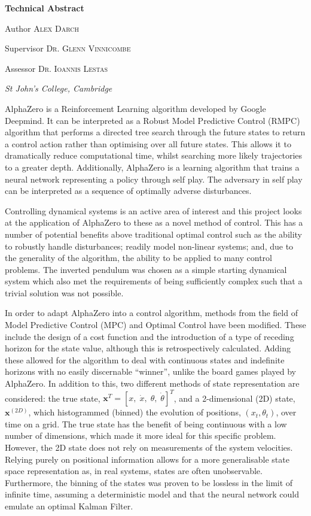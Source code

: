 \documentclass[../main.tex]{subfiles}
\begin{document}
{\Large \bfseries{Technical Abstract}}
\newline

Author
{\scshape\large Alex Darch} %

Supervisor
{\scshape\large Dr. Glenn Vinnicombe} %

Assessor
{\scshape\large Dr. Ioannis Lestas} %

\textit{St John's College, Cambridge}
\newline

AlphaZero is a Reinforcement Learning algorithm developed by Google Deepmind. It can be interpreted as a Robust Model Predictive Control (RMPC) algorithm that performs a directed tree search through the future states to return a control action rather than optimising over all future states. This allows it to dramatically reduce computational time, whilst searching more likely trajectories to a greater depth. Additionally, AlphaZero is a learning algorithm that trains a neural network representing a policy through self play. The adversary in self play can be interpreted as a sequence of optimally adverse disturbances.

Controlling dynamical systems is an active area of interest and this project looks at the application of AlphaZero to these as a novel method of control. This has a number of potential benefits above traditional optimal control such as the ability to robustly handle disturbances; readily model non-linear systems; and, due to the generality of the algorithm, the ability to be applied to many control problems. The inverted pendulum was chosen as a simple starting dynamical system which also met the requirements of being sufficiently complex such that a trivial solution was not possible.

In order to adapt AlphaZero into a control algorithm, methods from the field of Model Predictive Control (MPC) and Optimal Control have been modified. These include the design of a cost function and the introduction of a type of receding horizon for the state value, although this is retrospectively calculated. Adding these allowed for the algorithm to deal with continuous states and indefinite horizons with no easily discernable ``winner'', unlike the board games played by AlphaZero. In addition to this, two different methods of state representation are considered: the true state, $\boldsymbol{x}^T=[x, \; \dot{x}, \; \theta, \; \dot{\theta}]^T$, and a 2-dimensional (2D) state, $\boldsymbol{x}^{(2D)}$, which histogrammed (binned) the evolution of positions, $(x_t, \theta_t)$, over time on a grid. The true state has the benefit of being continuous with a low number of dimensions, which made it more ideal for this specific problem. However, the 2D state does not rely on measurements of the system velocities. Relying purely on positional information allows for a more generalisable state space representation as, in real systems, states are often unobservable. Furthermore, the binning of the states was proven to be lossless in the limit of infinite time, assuming a deterministic model and that the neural network could emulate an optimal Kalman Filter.
\end{document}
